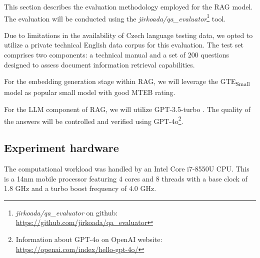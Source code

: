 This section describes the evaluation methodology employed for the \ac{RAG} model.
The evaluation will be conducted using the \textit{jirkoada/qa\_evaluator}\footnote {\textit{jirkoada/qa\_evaluator} on github: \url{https://github.com/jirkoada/qa_evaluator}} tool.

Due to limitations in the availability of Czech language testing data, we opted to utilize a private technical English data corpus for this evaluation.
The test set comprises two components: a technical manual and a set of 200 questions designed to assess document information retrieval capabilities.

For the embedding generation stage within \ac{RAG}, we will leverage the GTE\textsubscript{Small} model as popular small model with good \ac{MTEB} rating.

For the \ac{LLM} component of \ac{RAG}, we will utilize GPT-3.5-turbo \cite{brown2020language}.
The quality of the answers will be controlled and verified using GPT-4o\footnote{Information about GPT-4o on OpenAI website: \url{https://openai.com/index/hello-gpt-4o/}}.



\subsection{Experiment hardware}
The computational workload was handled by an Intel Core i7-8550U CPU.
This is a 14nm mobile processor featuring 4 cores and 8 threads with a base clock of 1.8 GHz and a turbo boost frequency of 4.0 GHz.



